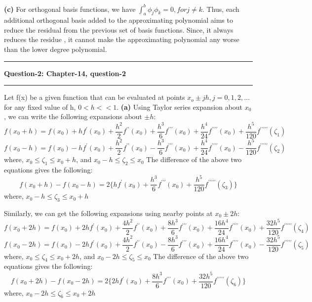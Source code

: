 \documentclass{article}
\newcommand\question[2]{\vspace{.25in}\hrule\textbf{#1: #2}\hrule\vspace{.10in}}
\renewcommand\part[1]{\vspace{.10in}\textbf{(#1)}}
\begin{document}
  \part{c} For orthogonal basis functions, we have $\int_{a}^{b} \phi_j \phi_k = 0, for j\neq k$. Thus, each additional orthogonal basis added to the approximating polynomial aims to reduce the residual from the previous set of basis functions. Since, it always reduces the residue , it cannot make the approximating polynomial any worse than the lower degree polynomial.
  

  \question{Question-2}{Chapter-14, question-2}
  Let f(x) be a given function that can be evaluated at points $x_o \pm jh, j=0,1,2,\dots$ for any fixed value of h, $0 < h << 1$. \newline
  \part{a} Using Taylor series expansion about $x_0$, we can write the following expansions about $\pm h$:
  \[ f(x_0 + h) = f(x_0) + hf^\prime(x_0) + \dfrac{h^2}{2}f^{\prime\prime}(x_0) + \dfrac{h^3}{6}f^{\prime\prime\prime}(x_0) + \dfrac{h^4}{24}f^{\prime\prime\prime\prime}(x_0) + \dfrac{h^5}{120}f^{\prime\prime\prime\prime\prime}(\zeta_1) \]
  \[ f(x_0 - h) = f(x_0) - hf^\prime(x_0) + \dfrac{h^2}{2}f^{\prime\prime}(x_0) - \dfrac{h^3}{6}f^{\prime\prime\prime}(x_0) + \dfrac{h^4}{24}f^{\prime\prime\prime\prime}(x_0) - \dfrac{h^5}{120}f^{\prime\prime\prime\prime\prime}(\zeta_2) \]
  where, $x_0 \leq \zeta_1 \leq x_0 + h$, and $x_0 - h \leq \zeta_2 \leq x_0$
  The difference of the above two equations gives the following:
  \begin{equation}
  f(x_0+h) - f(x_0-h) = 2\{ hf^\prime(x_0) + \dfrac{h^3}{6}f^{\prime\prime\prime}(x_0) + \dfrac{h^5}{120}f^{\prime\prime\prime\prime\prime}(\zeta_3) \}
  \label{eq:1ptdiff}
  \end{equation}
  where, $x_0 - h \leq \zeta_3 \leq x_0 + h$

  Similarly, we can get the following expansions using nearby points at $x_0 \pm 2h$:
  \[ f(x_0 + 2h) = f(x_0) + 2hf^\prime(x_0) + \dfrac{4h^2}{2}f^{\prime\prime}(x_0) + \dfrac{8h^3}{6}f^{\prime\prime\prime}(x_0) + \dfrac{16h^4}{24}f^{\prime\prime\prime\prime}(x_0) + \dfrac{32h^5}{120}f^{\prime\prime\prime\prime\prime}(\zeta_4) \]
  \[ f(x_0 - 2h) = f(x_0) - 2hf^\prime(x_0) + \dfrac{4h^2}{2}f^{\prime\prime}(x_0) - \dfrac{8h^3}{6}f^{\prime\prime\prime}(x_0) + \dfrac{16h^4}{24}f^{\prime\prime\prime\prime}(x_0) - \dfrac{32h^5}{120}f^{\prime\prime\prime\prime\prime}(\zeta_5) \]
  where, $x_0 \leq \zeta_4 \leq x_0 + 2h$, and $x_0 - 2h \leq \zeta_5 \leq x_0$
  The difference of the above two equations gives the following:
  \begin{equation}
  f(x_0+2h) - f(x_0-2h) = 2\{ 2hf^\prime(x_0) + \dfrac{8h^3}{6}f^{\prime\prime\prime}(x_0) + \dfrac{32h^5}{120}f^{\prime\prime\prime\prime\prime}(\zeta_6) \}
  \label{eq:2ptdiff}
  \end{equation}
  where, $x_0 - 2h \leq \zeta_6 \leq x_0 + 2h$
\end{document}
